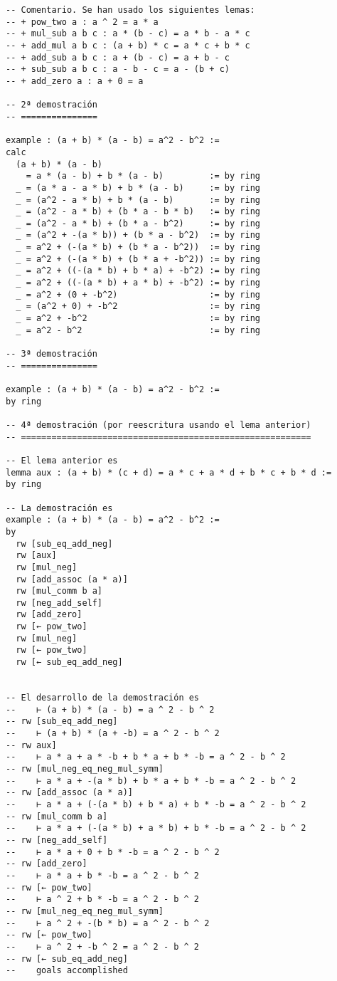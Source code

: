 \begin{verbatim}
-- Comentario. Se han usado los siguientes lemas:
-- + pow_two a : a ^ 2 = a * a
-- + mul_sub a b c : a * (b - c) = a * b - a * c
-- + add_mul a b c : (a + b) * c = a * c + b * c
-- + add_sub a b c : a + (b - c) = a + b - c
-- + sub_sub a b c : a - b - c = a - (b + c)
-- + add_zero a : a + 0 = a

-- 2ª demostración
-- ===============

example : (a + b) * (a - b) = a^2 - b^2 :=
calc
  (a + b) * (a - b)
    = a * (a - b) + b * (a - b)         := by ring
  _ = (a * a - a * b) + b * (a - b)     := by ring
  _ = (a^2 - a * b) + b * (a - b)       := by ring
  _ = (a^2 - a * b) + (b * a - b * b)   := by ring
  _ = (a^2 - a * b) + (b * a - b^2)     := by ring
  _ = (a^2 + -(a * b)) + (b * a - b^2)  := by ring
  _ = a^2 + (-(a * b) + (b * a - b^2))  := by ring
  _ = a^2 + (-(a * b) + (b * a + -b^2)) := by ring
  _ = a^2 + ((-(a * b) + b * a) + -b^2) := by ring
  _ = a^2 + ((-(a * b) + a * b) + -b^2) := by ring
  _ = a^2 + (0 + -b^2)                  := by ring
  _ = (a^2 + 0) + -b^2                  := by ring
  _ = a^2 + -b^2                        := by ring
  _ = a^2 - b^2                         := by ring

-- 3ª demostración
-- ===============

example : (a + b) * (a - b) = a^2 - b^2 :=
by ring

-- 4ª demostración (por reescritura usando el lema anterior)
-- =========================================================

-- El lema anterior es
lemma aux : (a + b) * (c + d) = a * c + a * d + b * c + b * d :=
by ring

-- La demostración es
example : (a + b) * (a - b) = a^2 - b^2 :=
by
  rw [sub_eq_add_neg]
  rw [aux]
  rw [mul_neg]
  rw [add_assoc (a * a)]
  rw [mul_comm b a]
  rw [neg_add_self]
  rw [add_zero]
  rw [← pow_two]
  rw [mul_neg]
  rw [← pow_two]
  rw [← sub_eq_add_neg]


-- El desarrollo de la demostración es
--    ⊢ (a + b) * (a - b) = a ^ 2 - b ^ 2
-- rw [sub_eq_add_neg]
--    ⊢ (a + b) * (a + -b) = a ^ 2 - b ^ 2
-- rw aux]
--    ⊢ a * a + a * -b + b * a + b * -b = a ^ 2 - b ^ 2
-- rw [mul_neg_eq_neg_mul_symm]
--    ⊢ a * a + -(a * b) + b * a + b * -b = a ^ 2 - b ^ 2
-- rw [add_assoc (a * a)]
--    ⊢ a * a + (-(a * b) + b * a) + b * -b = a ^ 2 - b ^ 2
-- rw [mul_comm b a]
--    ⊢ a * a + (-(a * b) + a * b) + b * -b = a ^ 2 - b ^ 2
-- rw [neg_add_self]
--    ⊢ a * a + 0 + b * -b = a ^ 2 - b ^ 2
-- rw [add_zero]
--    ⊢ a * a + b * -b = a ^ 2 - b ^ 2
-- rw [← pow_two]
--    ⊢ a ^ 2 + b * -b = a ^ 2 - b ^ 2
-- rw [mul_neg_eq_neg_mul_symm]
--    ⊢ a ^ 2 + -(b * b) = a ^ 2 - b ^ 2
-- rw [← pow_two]
--    ⊢ a ^ 2 + -b ^ 2 = a ^ 2 - b ^ 2
-- rw [← sub_eq_add_neg]
--    goals accomplished
\end{verbatim}

